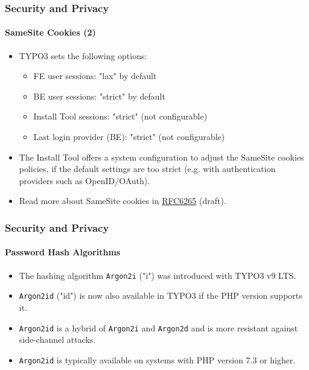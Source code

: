 
\begin{frame}[fragile]
	\frametitle{Security and Privacy}
	\framesubtitle{SameSite Cookies (2)}

	\begin{itemize}
		\item TYPO3 sets the following options:

			\begin{itemize}\small
				\item FE user sessions: "lax" by default
				\item BE user sessions: "strict" by default
				\item Install Tool sessions: "strict" (not configurable)
				\item Last login provider (BE): "strict" (not configurable)
			\end{itemize}\normalsize

		\item The Install Tool offers a system configuration to adjust the
			SameSite cookies policies, if the default settings are too strict
			(e.g. with authentication providers such as OpenID/OAuth).

		\item Read more about SameSite cookies in
			\href{https://tools.ietf.org/html/draft-ietf-httpbis-cookie-same-site-00}{RFC6265} (draft).
	\end{itemize}

\end{frame}


\begin{frame}[fragile]
	\frametitle{Security and Privacy}
	\framesubtitle{Password Hash Algorithms}

	\begin{itemize}
		\item The hashing algorithm \texttt{Argon2i} ("i") was introduced with TYPO3 v9 LTS.
		\item \texttt{Argon2id} ("id") is now also available in TYPO3 if the PHP version supports it.
		\item \texttt{Argon2id} is a hybrid of \texttt{Argon2i} and \texttt{Argon2d}
			and is more resistant against side-channel attacks.
		\item \texttt{Argon2id} is typically available on systems with PHP version 7.3 or higher.
	\end{itemize}

\end{frame}

